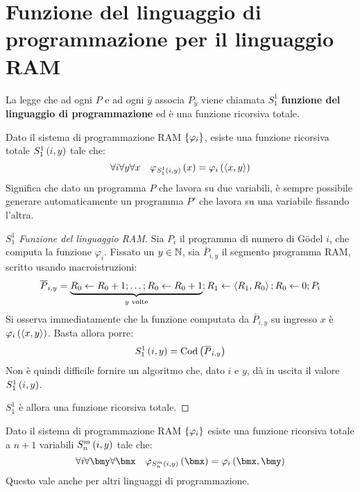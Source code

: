 \documentclass{lectures}
\begin{document}
\section{Funzione del linguaggio di programmazione per il linguaggio RAM}
\begin{multicols}{2}
    \begin{definition}
        La legge che ad ogni \(P\) e ad ogni \(\bar{y}\) associa \(P_{\bar{y}}\) viene chiamata \(S^1_1\) \textbf{funzione del linguaggio di programmazione} ed è una funzione ricorsiva totale.
    \end{definition}
    \begin{theorem}
        Dato il sistema di programmazione RAM \(\left\{\varphi_i\right\}\), esiste una funzione ricorsiva totale \(S^1_1\left(i,y\right)\) tale che:
        \[
            \forall i \forall y \forall x\quad \varphi_{S^1_1\left(i,y\right)}\left(x\right) = \varphi_i\left(\left\langle x,y\right\rangle\right)
        \]
        Significa che dato un programma \(P\) che lavora su due variabili, è sempre possibile generare automaticamente un programma \(P'\) che lavora su una variabile fissando l'altra.
    \end{theorem}
    \begin{proof}[\(S_1^1\) Funzione del linguaggio RAM]
        Sia \(P_i\) il programma di numero di Gödel \(i\), che computa la funzione \(\varphi_i\). Fissato un \(y \in \mathbb{N}\), sia \(\bar{P}_{i,y}\) il segmento programma RAM, scritto usando macroistruzioni:
        \[
            \overline{P}_{i,y} = \underbrace{R_0 \leftarrow R_0 +1; \ldots; R_0 \leftarrow R_0 +1}_{y\text{ volte}};R_1 \leftarrow \left\langle R_1, R_0\right\rangle; R_0 \leftarrow 0; P_i
        \]
        Si osserva immediatamente che la funzione computata da \(\bar{P}_{i,y}\) su ingresso \(x\) è \(\varphi_i\left(\left\langle x,y\right\rangle\right)\). Basta allora porre:
        \[
            S^1_1\left(i,y\right) = \text{Cod}\left(\overline{P}_{i,y}\right)
        \]
        Non è quindi difficile fornire un algoritmo che, dato \(i\) e \(y\), dà in uscita il valore \(S^1_1\left(i,y\right)\).
        
        \(S^1_1\) è allora una funzione ricorsiva totale.
    \end{proof}
    \begin{theorem}
        Dato il sistema di programmazione RAM \(\left\{\varphi_i\right\}\) esiste una funzione ricorsiva totale a \(n+1\) variabili \(S^m_n\left(i,y\right)\) tale che:
        \[
            \forall i \forall \bmy \forall \bmx \quad \varphi_{S^m_n\rnd{i,y}}\rnd{\bmx} = \varphi_i\rnd{\bmx, \bmy}
        \]
        Questo vale anche per altri linguaggi di programmazione.
    \end{theorem}
\end{multicols}
\end{document}
